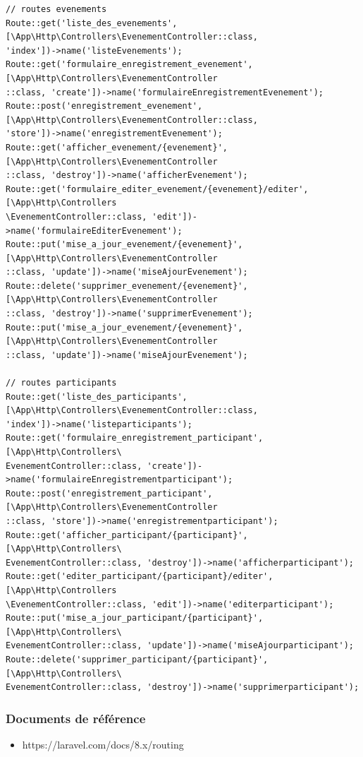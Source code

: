 \documentclass[12pt,a4paper]{article}
\begin{document}
\begin{verbatim}
// routes evenements
Route::get('liste_des_evenements', [\App\Http\Controllers\EvenementController::class, 
'index'])->name('listeEvenements');
Route::get('formulaire_enregistrement_evenement', [\App\Http\Controllers\EvenementController
::class, 'create'])->name('formulaireEnregistrementEvenement');
Route::post('enregistrement_evenement', [\App\Http\Controllers\EvenementController::class, 
'store'])->name('enregistrementEvenement');
Route::get('afficher_evenement/{evenement}', [\App\Http\Controllers\EvenementController
::class, 'destroy'])->name('afficherEvenement');
Route::get('formulaire_editer_evenement/{evenement}/editer', [\App\Http\Controllers
\EvenementController::class, 'edit'])->name('formulaireEditerEvenement');
Route::put('mise_a_jour_evenement/{evenement}', [\App\Http\Controllers\EvenementController
::class, 'update'])->name('miseAjourEvenement');
Route::delete('supprimer_evenement/{evenement}', [\App\Http\Controllers\EvenementController
::class, 'destroy'])->name('supprimerEvenement');
Route::put('mise_a_jour_evenement/{evenement}', [\App\Http\Controllers\EvenementController
::class, 'update'])->name('miseAjourEvenement');

// routes participants
Route::get('liste_des_participants', [\App\Http\Controllers\EvenementController::class, 
'index'])->name('listeparticipants');
Route::get('formulaire_enregistrement_participant', [\App\Http\Controllers\
EvenementController::class, 'create'])->name('formulaireEnregistrementparticipant');
Route::post('enregistrement_participant', [\App\Http\Controllers\EvenementController
::class, 'store'])->name('enregistrementparticipant');
Route::get('afficher_participant/{participant}', [\App\Http\Controllers\
EvenementController::class, 'destroy'])->name('afficherparticipant');
Route::get('editer_participant/{participant}/editer', [\App\Http\Controllers
\EvenementController::class, 'edit'])->name('editerparticipant');
Route::put('mise_a_jour_participant/{participant}', [\App\Http\Controllers\
EvenementController::class, 'update'])->name('miseAjourparticipant');
Route::delete('supprimer_participant/{participant}', [\App\Http\Controllers\
EvenementController::class, 'destroy'])->name('supprimerparticipant');

\end{verbatim}

\subsubsection{Documents de référence}
\begin{itemize}
\item https://laravel.com/docs/8.x/routing
\end{itemize}
\end{document}
